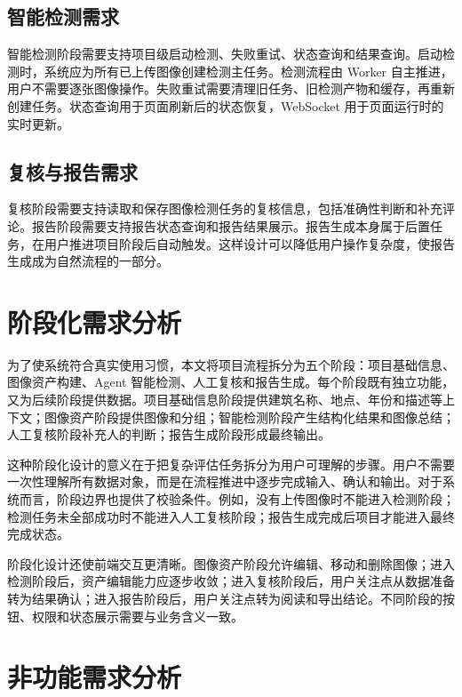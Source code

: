 \subsection{智能检测需求}
\label{subsec:detection-requirement}

智能检测阶段需要支持项目级启动检测、失败重试、状态查询和结果查询。启动检测时，系统应为所有已上传图像创建检测主任务。检测流程由 Worker 自主推进，用户不需要逐张图像操作。失败重试需要清理旧任务、旧检测产物和缓存，再重新创建任务。状态查询用于页面刷新后的状态恢复，WebSocket 用于页面运行时的实时更新。

\subsection{复核与报告需求}
\label{subsec:review-report-requirement}

复核阶段需要支持读取和保存图像检测任务的复核信息，包括准确性判断和补充评论。报告阶段需要支持报告状态查询和报告结果展示。报告生成本身属于后置任务，在用户推进项目阶段后自动触发。这样设计可以降低用户操作复杂度，使报告生成成为自然流程的一部分。

\section{阶段化需求分析}
\label{sec:req-stage-analysis}

为了使系统符合真实使用习惯，本文将项目流程拆分为五个阶段：项目基础信息、图像资产构建、Agent 智能检测、人工复核和报告生成。每个阶段既有独立功能，又为后续阶段提供数据。项目基础信息阶段提供建筑名称、地点、年份和描述等上下文；图像资产阶段提供图像和分组；智能检测阶段产生结构化结果和图像总结；人工复核阶段补充人的判断；报告生成阶段形成最终输出。

这种阶段化设计的意义在于把复杂评估任务拆分为用户可理解的步骤。用户不需要一次性理解所有数据对象，而是在流程推进中逐步完成输入、确认和输出。对于系统而言，阶段边界也提供了校验条件。例如，没有上传图像时不能进入检测阶段；检测任务未全部成功时不能进入人工复核阶段；报告生成完成后项目才能进入最终完成状态。

阶段化设计还使前端交互更清晰。图像资产阶段允许编辑、移动和删除图像；进入检测阶段后，资产编辑能力应逐步收敛；进入复核阶段后，用户关注点从数据准备转为结果确认；进入报告阶段后，用户关注点转为阅读和导出结论。不同阶段的按钮、权限和状态展示需要与业务含义一致。

\section{非功能需求分析}
\label{sec:nonfunctional-analysis}

